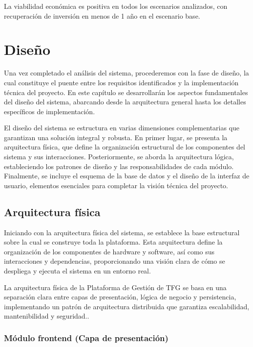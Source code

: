 \documentclass[12pt,a4paper,oneside]{report}
\begin{document}
La viabilidad económica es positiva en todos los escenarios analizados,
con recuperación de inversión en menos de 1 año en el escenario base.

\chapter{Diseño}\label{diseuxf1o}
Una vez completado el análisis del sistema, procederemos con la fase de
diseño, la cual constituye el puente entre los requisitos identificados
y la implementación técnica del proyecto. En este capítulo se
desarrollarán los aspectos fundamentales del diseño del sistema,
abarcando desde la arquitectura general hasta los detalles específicos
de implementación.

El diseño del sistema se estructura en varias dimensiones
complementarias que garantizan una solución integral y robusta. En
primer lugar, se presenta la arquitectura física, que define la
organización estructural de los componentes del sistema y sus
interacciones. Posteriormente, se aborda la arquitectura lógica,
estableciendo los patrones de diseño y las responsabilidades de cada
módulo. Finalmente, se incluye el esquema de la base de datos y el
diseño de la interfaz de usuario, elementos esenciales para completar la
visión técnica del proyecto.

\section{Arquitectura física}\label{arquitectura-fuxedsica}

Iniciando con la arquitectura física del sistema, se establece la base
estructural sobre la cual se construye toda la plataforma. Esta
arquitectura define la organización de los componentes de hardware y
software, así como sus interacciones y dependencias, proporcionando una
visión clara de cómo se despliega y ejecuta el sistema en un entorno
real.

La arquitectura física de la Plataforma de Gestión de TFG se basa en una
separación clara entre capas de presentación, lógica de negocio y
persistencia, implementando un patrón de arquitectura distribuida que
garantiza escalabilidad, mantenibilidad y seguridad..

\subsection{Módulo frontend (Capa de
presentación)}\label{muxf3dulo-frontend-capa-de-presentaciuxf3n}
\end{document}
